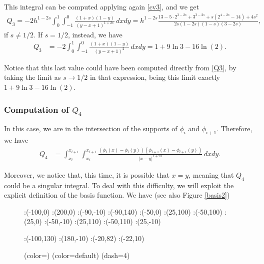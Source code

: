 {This integral can be computed applying again \eqref{cv3}, and we get
\begin{align}\label{Q3}
	Q_3 = -2h^{1-2s}\int_0^1\int_{-1}^0 \frac{(1+x)(1-y)}{(y-x+1)^{1+2s}}\,dxdy = h^{1-2s}\frac{13-5\cdot 2^{3-2s}+3^{3-2s}+s(2^{4-2s}-14)+4s^2}{2s(1-2s)(1-s)(3-2s)},
\end{align}
if $s\neq 1/2$. If $s=1/2$, instead, we have 
\begin{align*}
	Q_3 &= -2\int_0^1\int_{-1}^0 \frac{(1+x)(1-y)}{(y-x+1)^2}\,dxdy = 1+9\ln 3-16\ln(2).
\end{align*}

Notice that this last value could have been computed directly from \eqref{Q3}, by taking the limit as $s\to 1/2$ in that expression, being this limit exactly $1+9\ln 3-16\ln(2)$.

\subsubsection*{Computation of $Q_4$}
In this case, we are in the intersection of the supports of $\phi_i$ and $\phi_{i+1}$. Therefore, we have
\begin{align*}
	Q_4 &= \int_{x_i}^{x_{i+1}}\int_{x_i}^{x_{i+1}} \frac{(\phi_i(x)-\phi_i(y))(\phi_{i+1}(x)-\phi_{i+1}(y))}{|x-y|^{1+2s}}\,dxdy. 
\end{align*}

Moreover, we notice that, this time, it is possible that $x=y$, meaning that $Q_4$ could be a singular integral. To deal with this difficulty, we will exploit the explicit definition of the basis function. We have (see also Figure \ref{basis2})
\begin{figure}[h]
\figinit{0.8pt}
:(-100,0) :(200,0)
:(-90,-10) :(-90,140)
:(-50,0) :(25,100) 
:(-50,100) :(25,0)
%
:(-50,-10) :(25,110) 
:(-50,110) :(25,-10)

:(-100,130) :(180,-10)
:(-20,82) :(-22,10)

\figdrawbegin{}
\figdrawarrow[1,2]
\figset (color=\Redrgb)
\figdrawline[3,4]
\figset (color=default)
\figdrawline[5,6]
\figset(dash=4)
\figdrawline[4,6]
\figdrawarrow[11,12]
\figdrawline[3,5]
\figdrawend


\end{figure}}
